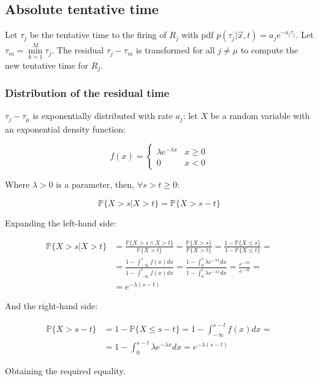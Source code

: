   \subsection{Absolute tentative time}
  Let $\tau_j$ be the tentative time to the firing of $R_j$ with pdf $p(\tau_j|\vec{x},t) = a_je^{-a_j\tau_j}$.
  Let $\tau_m = \min\limits_{k=1}^M\tau_j$.
  The residual $\tau_j-\tau_m$ is transformed for all $j\neq\mu$ to compute the new tentative time for $R_j$.

    \subsubsection{Distribution of the residual time}
    $\tau_j-\tau_\mu$ is exponentially distributed with rate $a_j$: let $X$ be a random variable with an exponential density function:

    $$f(x) = \begin{cases}\lambda e^{-\lambda x} & x\ge 0\\ 0 &x < 0\end{cases}$$

    Where $\lambda>0$ is a parameter, then, $\forall s >t\ge 0$:

    $$\mathbb{P}\{X>s|X>t\} = \mathbb{P}\{X>s-t\}$$

    Expanding the left-hand side:

    \begin{align*}
      \mathbb{P}\{X>s|X>t\} &= \frac{\mathbb{P}\{X>s\land X>t\}}{\mathbb{P}\{X>t\}} = \frac{\mathbb{P}\{X>s\}}{\mathbb{P}\{X>t\}} = \frac{1-\mathbb{P}\{X\le s\}}{1-\mathbb{P}\{X\le t\}} =\\
                            &=\frac{1-\int_{-\infty}^sf(x)dx}{1-\int_{-\infty}^tf(x)dx} = \frac{1-\int_0^s\lambda e^{-\lambda x}dx}{1-\int_0^t\lambda e^{-\lambda x}dx} = \frac{e^{-\lambda s}}{e^{-\lambda t}}=\\
                            &=e^{-\lambda(s-t)}
    \end{align*}

    And the right-hand side:


    \begin{align*}
      \mathbb{P}\{X>s-t\} &= 1-\mathbb{P}\{X\le s-t\} = 1-\int_{-\infty}^{s-t}f(x)dx =\\
                          &= 1-\int_{0}^{s-t}\lambda e^{-\lambda x}dx = e^{-\lambda(s-t)}
    \end{align*}

    Obtaining the required equality.

